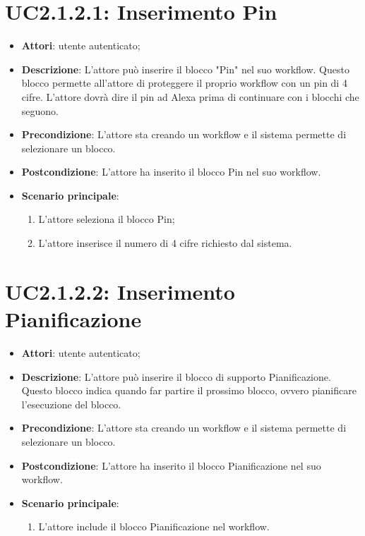 \section{UC2.1.2.1: Inserimento Pin}
\label{UC2.1.2.1}
\begin{itemize}
	\item \textbf{Attori}: utente autenticato;
	\item \textbf{Descrizione}: L'attore può inserire il blocco "Pin" nel suo workflow. Questo blocco permette all'attore di proteggere il proprio workflow con un pin di 4 cifre. L'attore dovrà dire il pin ad Alexa prima di continuare con i blocchi che seguono.
	\item \textbf{Precondizione}: L'attore sta creando un workflow e il sistema permette di selezionare un blocco.
	\item \textbf{Postcondizione}: L'attore ha inserito il blocco Pin nel suo workflow.
	\item \textbf{Scenario principale}:
	\begin{enumerate} \item L'attore seleziona il blocco Pin;  \item 
		L'attore inserisce il numero di 4 cifre richiesto dal sistema.\end{enumerate}
\end{itemize}

\section{UC2.1.2.2: Inserimento Pianificazione}
\label{UC2.1.2.2}
\begin{itemize}
	\item \textbf{Attori}: utente autenticato;
	\item \textbf{Descrizione}: L'attore può inserire il blocco di supporto Pianificazione. Questo blocco indica quando far partire il prossimo blocco, ovvero pianificare l'esecuzione del blocco.
	\item \textbf{Precondizione}: L'attore sta creando un workflow e il sistema permette di selezionare un blocco.
	\item \textbf{Postcondizione}: L'attore ha inserito il blocco Pianificazione nel suo workflow.
	\item \textbf{Scenario principale}:
	\begin{enumerate} \item L'attore include il blocco Pianificazione nel workflow.\end{enumerate}
\end{itemize}

